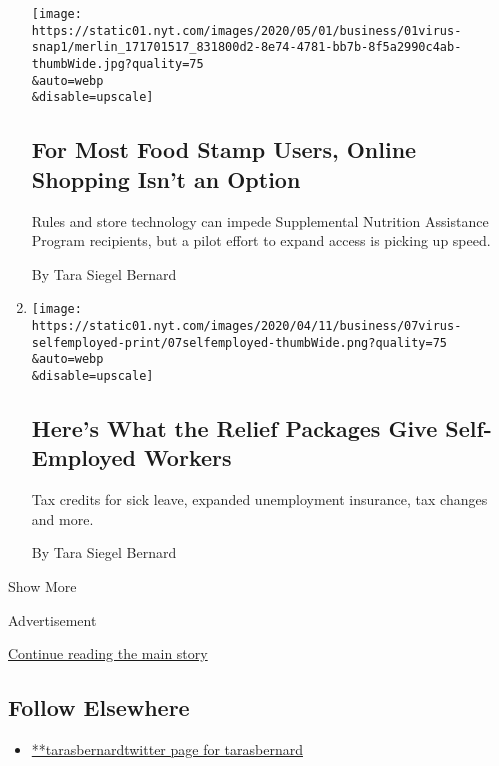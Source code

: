 \begin{enumerate}
  \texttt{[image: https://static01.nyt.com/images/2020/05/01/business/01virus-snap1/merlin\_171701517\_831800d2-8e74-4781-bb7b-8f5a2990c4ab-thumbWide.jpg?quality=75\\\&auto=webp\\\&disable=upscale]}

  \hypertarget{for-most-food-stamp-users-online-shopping-isnt-an-option}{%
  \subsection{For Most Food Stamp Users, Online Shopping Isn't an
  Option}\label{for-most-food-stamp-users-online-shopping-isnt-an-option}}

  Rules and store technology can impede Supplemental Nutrition
  Assistance Program recipients, but a pilot effort to expand access is
  picking up speed.

  By Tara Siegel Bernard
\item
  \href{/article/self-employed-workers-unemployment-coronavirus-stimulus-package.html}{}

  \texttt{[image: https://static01.nyt.com/images/2020/04/11/business/07virus-selfemployed-print/07selfemployed-thumbWide.png?quality=75\\\&auto=webp\\\&disable=upscale]}

  \hypertarget{heres-what-the-relief-packages-give-self-employed-workers}{%
  \subsection{Here's What the Relief Packages Give Self-Employed
  Workers}\label{heres-what-the-relief-packages-give-self-employed-workers}}

  Tax credits for sick leave, expanded unemployment insurance, tax
  changes and more.

  By Tara Siegel Bernard
\end{enumerate}

Show More

Advertisement

\protect\hyperlink{after-mid2}{Continue reading the main story}

\hypertarget{follow-elsewhere}{%
\subsection{Follow Elsewhere}\label{follow-elsewhere}}

\begin{itemize}
\tightlist
\item
  \href{https://twitter.com/tarasbernard}{**tarasbernardtwitter page for
  tarasbernard}
\end{itemize}

